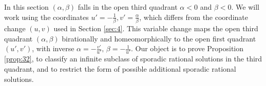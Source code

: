 \documentclass[12pt,letterpaper, reqno]{amsart}
\theoremstyle{definition}
\theoremstyle{remark}
\renewcommand{\AA}{\mathbb{A}}
\newcommand{\PP}{\mathbb{P}}
\newcommand{\uu}{{u'}}
\newcommand{\vv}{{v'}}
\begin{document}
In this section $(\alpha, \beta)$  falls  in the open third quadrant $\alpha<0$ and  $\beta <0$.
We  will work using  the coordinates  
$\uu= -\frac{1}{\beta}, \vv = \frac{\alpha}{\beta}$, which differs from the coordinate change
$(u, v)$ used in Section \ref{sec:4}. This variable change maps the open
third quadrant $(\alpha, \beta)$ birationally and homeomorphically to the open first quadrant $(\uu,\vv)$, 
with inverse $\alpha= -\frac{\vv}{\uu},\, \beta= -\frac{1}{\uu}.$
Our object is to prove  Proposition \ref{prop:32},  to classify an infinite subclass of 
sporadic rational solutions in the third quadrant, and to restrict the form of possible
additional sporadic rational solutions.
\end{document}
